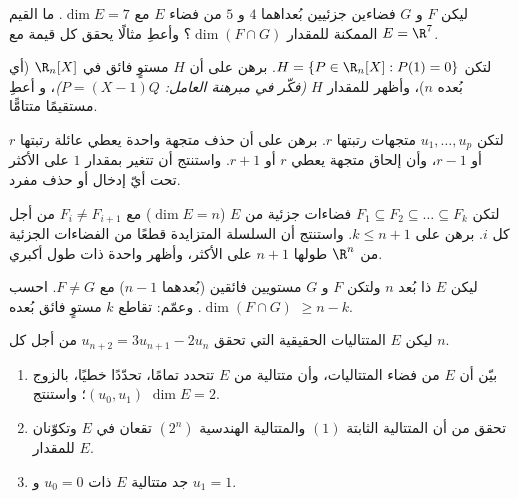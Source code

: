 \begin{exercise}[$\star\star$]\label{exo:b1:findim:5}
ليكن $F$ و $G$ فضاءين جزئيين بُعداهما $4$ و $5$ من فضاء
$E$ مع $\dim E = 7$. ما القيم الممكنة للمقدار $\dim(F \cap
G)$؟ وأعطِ مثالًا يحقق كل قيمة مع $E = \R^7$.
\end{exercise}

\begin{exercise}[$\star\star$]\label{exo:b1:findim:6}
لتكن $H = \{P \in \R_n[X] : P(1) = 0\}$. برهن على أن $H$
مستوٍ فائق في $\R_n[X]$ (أي  بُعده $n$)، وأظهر
 للمقدار $H$ \emph{(فكّر في مبرهنة العامل: $P = (X-1)Q$)}، و
أعطِ مستقيمًا متتامًّا.
\end{exercise}

\begin{exercise}[$\star\star$]\label{exo:b1:findim:7}
لتكن $u_1, \dots, u_p$ متجهات رتبتها $r$. برهن على أن حذف
متجهة واحدة يعطي عائلة رتبتها $r$ أو $r - 1$، وأن
إلحاق متجهة يعطي  $r$ أو $r + 1$. واستنتج أن 
تتغير بمقدار $1$ على الأكثر تحت أيّ إدخال أو حذف مفرد.
\end{exercise}

\begin{exercise}[$\star\star\star$]\label{exo:b1:findim:8}
لتكن $F_1 \subseteq F_2 \subseteq \dots \subseteq F_k$ فضاءات جزئية
من $E$ ($\dim E = n$) مع $F_i \neq F_{i+1}$ من أجل كل $i$. برهن على $k
\leq n + 1$. واستنتج أن السلسلة المتزايدة قطعًا من الفضاءات الجزئية
من $\R^n$ طولها $n + 1$ على الأكثر، وأظهر واحدة ذات طول
أكبري.
\end{exercise}

\begin{exercise}[$\star\star\star$]\label{exo:b1:findim:9}
ليكن $E$ ذا بُعد $n$ ولتكن $F$ و $G$ مستويين فائقين (بُعدهما
$n - 1$) مع $F \neq G$. احسب $\dim(F \cap G)$. وعمّم: تقاطع
$k$ مستوٍ فائق بُعده $\geq n - k$.
\end{exercise}

\begin{exercise}[$\star\star$]\label{exo:b1:findim:10}
ليكن $E$  المتتاليات الحقيقية التي تحقق $u_{n+2} =
3u_{n+1} - 2u_n$ من أجل كل $n$.
\begin{enumerate}
  \item بيّن أن $E$  من فضاء المتتاليات، وأن
        متتالية من $E$ تتحدد تمامًا، تحدّدًا خطيًا،
        بالزوج $(u_0, u_1)$؛ واستنتج $\dim E = 2$.
  \item تحقق من أن المتتالية الثابتة $(1)$ والمتتالية الهندسية
        $(2^n)$ تقعان في $E$ وتكوّنان  للمقدار $E$.
  \item جد متتالية $E$ ذات $u_0 = 0$ و $u_1 = 1$.
\end{enumerate}
\end{exercise}

